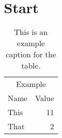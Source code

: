 \documentclass{article}
\begin{document}
\section{Start}

\begin{table}
\caption{This is an example caption for the table.}
\label{tab:example}

\begin{tabular}{lr}
\multicolumn{2}{c}{Example}\\
Name&Value\\
This& 11 \\
That & 2
\end{tabular}

\end{table}
\end{document}
